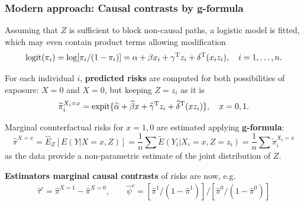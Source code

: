 \documentclass[12pt,dvipsnames,t,aspectratio=169, handout%
]{beamer}
\begin{document}
\begin{frame}
\frametitle{\large Modern approach: Causal contrasts by g-formula}

\bi
\item
Assuming that $Z$ is sufficient to block non-causal paths, a logistic model is fitted,
which may even contain product terms allowing modification
$$ \text{logit}(\pi_i) = \log[\pi_i/(1-\pi_i)] = 
\alpha + \beta x_i + \gamma^{\small\text{T}} z_i + \delta^{\small\text{T}} (x_i z_i), \quad i=1, \dots, n. $$
\item
For each individual $i$, \textbf{predicted risks} are computed
for both possibilities of exposure: $X=0$ and $X=0$, but keeping $Z=z_i$ as it is
$$ \widetilde{\pi}_i^{X_i=x} = \text{expit}\{ \widehat\alpha + \widehat\beta x + 
   \widehat\gamma^{\small\text{T}} z_i + \widehat\delta^{\small\text{T}} (x z_i)\}, \quad x=0,1 .  $$ 
\item
Marginal counterfactual risks for $x=1,0$ are estimated applying {\bf g-formula}:
$$ \widehat{\pi}^{X=x} = \widehat{E}_Z[E(Y|X=x, Z)]  = \frac{1}{n} \sum \widetilde{E}(Y_i|X_i=x, Z=z_i) 
= \frac{1}{n} \sum \widetilde{\pi}_i^{X_i=x}
$$
as the data provide a non-parametric estimate of the joint distribution of $Z$.
\medskip
\item
\textbf{Estimators marginal causal contrasts} of risks are now, e.g.
\begin{align*}
 \widehat\tau^c = \widehat{\pi}^{X=1} - \widehat{\pi}^{X=0}, \qquad 
	 \widehat\psi^c = [ \widehat{\pi}^{1}/(1-  \widehat{\pi}^{1})]/ [ \widehat{\pi}^{0}/(1-  \widehat{\pi}^{0})]
\end{align*}	

\ei
\end{frame}
\end{document}
